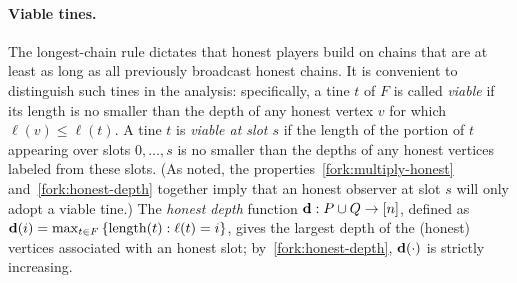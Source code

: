  \paragraph{Viable tines.}
 The longest-chain rule dictates that honest players build on chains
 that are at least as long as all previously broadcast honest
 chains. It is convenient to distinguish such tines in the analysis:
 specifically, a tine $t$ of $F$ is called \emph{viable} if its length
 is no smaller than the depth of any honest vertex $v$ for which
 $\ell(v) \leq \ell(t)$. A tine $t$ is \emph{viable at slot $s$} if
 the length of the portion of $t$ appearing over slots $0,\ldots, s$ 
 is no smaller than the depths of any honest vertices labeled from these slots. (As noted,
 the properties~\ref{fork:multiply-honest} and~\ref{fork:honest-depth}
 together imply that an honest observer at slot $s$ will only adopt a
 viable tine.)  
 The \emph{honest depth} function
 $\mathbf{d} : P \cup Q \rightarrow [n]$, 
 defined as $\mathbf{d}(i) = \max_{t \in F} \left\{ \operatorname{length}(t) : \ell(t) = i \right\}$, 
 gives the largest depth of the (honest) vertices 
 associated with an honest slot; by~\ref{fork:honest-depth},
 $\mathbf{d}(\cdot)$ is strictly increasing.








